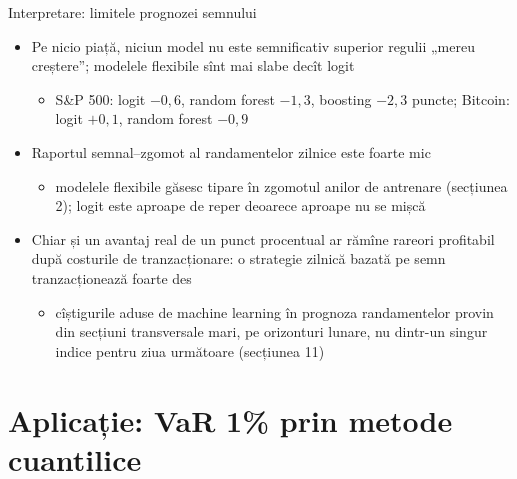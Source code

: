 \begin{frame}{Interpretare: limitele prognozei semnului}
\itemsize{\small}
\begin{itemize}
    \item Pe nicio piață, niciun model nu este semnificativ superior regulii „mereu creștere”; modelele flexibile sînt mai slabe decît logit
    \begin{itemize}
        \item S\&P 500: logit $-0{,}6$, random forest $-1{,}3$, boosting $-2{,}3$ puncte; Bitcoin: logit $+0{,}1$, random forest $-0{,}9$
    \end{itemize}
    \item Raportul semnal--zgomot al randamentelor zilnice este foarte mic
    \begin{itemize}
        \item modelele flexibile găsesc tipare în zgomotul anilor de antrenare (secțiunea 2); logit este aproape de reper deoarece aproape nu se mișcă
    \end{itemize}
    \item Chiar și un avantaj real de un punct procentual ar rămîne rareori profitabil după costurile de tranzacționare: o strategie zilnică bazată pe semn tranzacționează foarte des
    \begin{itemize}
        \item cîștigurile aduse de machine learning în prognoza randamentelor provin din secțiuni transversale mari, pe orizonturi lunare, nu dintr-un singur indice pentru ziua următoare (secțiunea 11)
    \end{itemize}
\end{itemize}
\end{frame}


\section{Aplicație: VaR 1\% prin metode cuantilice}

